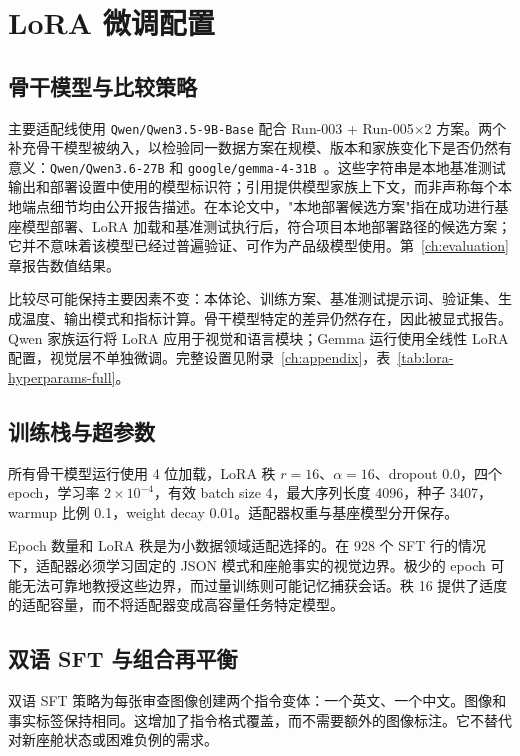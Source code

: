 \section{LoRA 微调配置}\label{sec:method-lora-config}

\subsection{骨干模型与比较策略}

主要适配线使用 \texttt{Qwen/Qwen3.5-9B-Base} 配合 Run-003 + Run-005$\times$2 方案。两个补充骨干模型被纳入，以检验同一数据方案在规模、版本和家族变化下是否仍然有意义：\texttt{Qwen/Qwen3.6-27B} 和 \texttt{google/gemma-4-31B}~\citep{gemma2024,gemma32025}。这些字符串是本地基准测试输出和部署设置中使用的模型标识符；引用提供模型家族上下文，而非声称每个本地端点细节均由公开报告描述。在本论文中，"本地部署候选方案"指在成功进行基座模型部署、LoRA 加载和基准测试执行后，符合项目本地部署路径的候选方案；它并不意味着该模型已经过普遍验证、可作为产品级模型使用。第~\ref{ch:evaluation} 章报告数值结果。

比较尽可能保持主要因素不变：本体论、训练方案、基准测试提示词、验证集、生成温度、输出模式和指标计算。骨干模型特定的差异仍然存在，因此被显式报告。Qwen 家族运行将 LoRA 应用于视觉和语言模块；Gemma 运行使用全线性 LoRA 配置，视觉层不单独微调。完整设置见附录~\ref{ch:appendix}，表~\ref{tab:lora-hyperparams-full}。

\subsection{训练栈与超参数}

所有骨干模型运行使用 4 位加载，LoRA 秩 $r=16$、$\alpha=16$、dropout $0.0$，四个 epoch，学习率 $2 \times 10^{-4}$，有效 batch size 4，最大序列长度 4096，种子 3407，warmup 比例 0.1，weight decay 0.01。适配器权重与基座模型分开保存。

Epoch 数量和 LoRA 秩是为小数据领域适配选择的。在 928 个 SFT 行的情况下，适配器必须学习固定的 JSON 模式和座舱事实的视觉边界。极少的 epoch 可能无法可靠地教授这些边界，而过量训练则可能记忆捕获会话。秩 16 提供了适度的适配容量，而不将适配器变成高容量任务特定模型。

\subsection{双语 SFT 与组合再平衡}

双语 SFT 策略为每张审查图像创建两个指令变体：一个英文、一个中文。图像和事实标签保持相同。这增加了指令格式覆盖，而不需要额外的图像标注。它不替代对新座舱状态或困难负例的需求。

